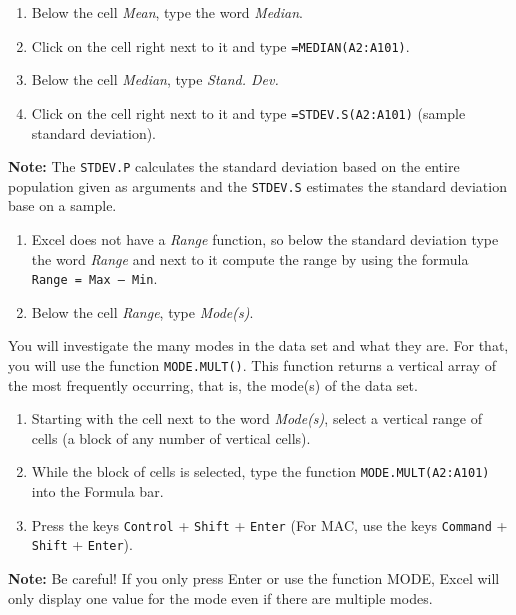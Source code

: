 \documentclass[
]{book}
\providecommand{\tightlist}{%
  \setlength{\itemsep}{0pt}\setlength{\parskip}{0pt}}
\begin{document}
\begin{enumerate}
\def\labelenumi{\arabic{enumi}.}
\setcounter{enumi}{2}
\tightlist
\item
  Below the cell \emph{Mean}, type the word \emph{Median}.
\item
  Click on the cell right next to it and type \texttt{=MEDIAN(A2:A101)}.
\item
  Below the cell \emph{Median}, type \emph{Stand. Dev.}
\item
  Click on the cell right next to it and type \texttt{=STDEV.S(A2:A101)} (sample standard deviation).
\end{enumerate}

\textbf{Note:} The \texttt{STDEV.P} calculates the standard deviation based on the entire population given as arguments and the \texttt{STDEV.S} estimates the standard deviation base on a sample.

\begin{enumerate}
\def\labelenumi{\arabic{enumi}.}
\setcounter{enumi}{6}
\tightlist
\item
  Excel does not have a \emph{Range} function, so below the standard deviation type the word \emph{Range} and next to it compute the range by using the formula \texttt{Range\ =\ Max\ –\ Min}.
\item
  Below the cell \emph{Range}, type \emph{Mode(s)}.
\end{enumerate}

You will investigate the many modes in the data set and what they are. For that, you will use the function \texttt{MODE.MULT()}. This function returns a vertical array of the most frequently occurring, that is, the mode(s) of the data set.

\begin{enumerate}
\def\labelenumi{\arabic{enumi}.}
\setcounter{enumi}{8}
\tightlist
\item
  Starting with the cell next to the word \emph{Mode(s)}, select a vertical range of cells (a block of any number of vertical cells).
\item
  While the block of cells is selected, type the function \texttt{MODE.MULT(A2:A101)} into the Formula bar.
\item
  Press the keys \texttt{Control} + \texttt{Shift} + \texttt{Enter} (For MAC, use the keys \texttt{Command} + \texttt{Shift} + \texttt{Enter}).
\end{enumerate}

\textbf{Note:} Be careful! If you only press Enter or use the function MODE, Excel will only display one value for the mode even if there are multiple modes.
\end{document}
